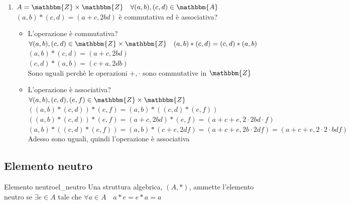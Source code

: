 \documentclass[12pt, letterpaper]{report}
\newcounter{definition}
\newcommand{\nmu}{}
\begin{document}
\begin{enumerate}
			$\forall a,b \in \mathbbm{Q} \quad a*b=b*a$? \\
			$a*b = a\cdot b + a$ \\
			$b*a = b \cdot a + b$ \\
			Questi in generale se $a \neq b$ non sono uguali quindi l'operazione non è commutativa.
			\item $A = \mathbbm{Z} \times \mathbbm{Z} \quad \forall (a,b), (c,d) \in \mathbbm{A}$ \\
			$(a,b) * (c,d) = (a + c, 2bd)$ è commutativa ed è associativa? \\
			\begin{itemize}
				\item L'operazione è commutativa? \\
				$\forall (a,b), (c,d) \in \mathbbm{Z} \times \mathbbm{Z} \quad (a,b)*(c,d) = (c,d)*(a,b)$ \\
				$(a,b)*(c,d)=(a+c, 2bd)$ \\
				$(c,d)*(a,b) = (c+a, 2db)$ \\
				Sono uguali perchè le operazioni $+, \cdot$ sono commutative in $\mathbbm{Z}$
				\item L'operazione è associativa? \\
				$\forall (a,b), (c,d), (e,f) \in \mathbbm{Z} \times \mathbbm{Z}$ \\
				$((a,b) * (c,d))* (e,f) = (a,b)*((c,d) * (e, f))$ \\
				$((a,b) * (c,d))* (e,f) = (a+c, 2bd)*(e,f) = (a+c+e, 2 \cdot 2bd \cdot f)$ \\
				$(a,b)*((c,d) * (e, f)) = (a,b)*(c+e, 2df) =(a+c+e, 2b \cdot 2df) = (a+c+e, 2 \cdot 2 \cdot bdf)$ \\
				Adesso sono uguali, quindi l'operazione è associativa
			\end{itemize}
		\end{enumerate}
		\subsection{Elemento neutro}
		\begin{definition}{\nmu Elemento neutro}{el_neutro}
			Una struttura algebrica, $(A, *)$, ammette l'elemento neutro se $\exists e \in A$ tale che $\forall a \in A \quad a*e = e*a=a$
		\end{definition}
\end{document}
